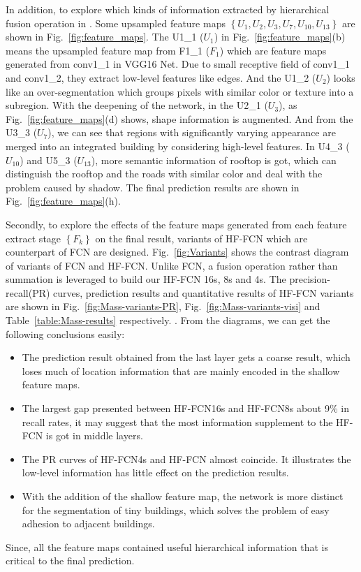 In addition, to explore which kinds of information extracted by hierarchical fusion operation in .
Some upsampled feature maps ${\left\{U_1,U_2,U_3,U_7,U_{10},U_{13}\right\}}$ are shown in Fig.~\ref{fig:feature_maps}.
The U1\_1 (${U_1}$) in Fig.~\ref{fig:feature_maps}(b) means the upsampled feature map from F1\_1 (${F_1}$) which are feature maps generated from conv1\_1 in VGG16 Net.
Due to small receptive field of conv1\_1 and conv1\_2, they extract low-level features like edges.
And the U1\_2 (${U_2}$) looks like an over-segmentation which groups pixels with similar color or texture into a subregion.
With the deepening of the network, in the U2\_1 (${U_3}$), as Fig.~\ref{fig:feature_maps}(d) shows, shape information is augmented.
And from the U3\_3 (${U_7}$), we can see that regions with significantly varying appearance are merged into an integrated building by considering high-level features.
In U4\_3 (${U_{10}}$) and U5\_3 ($U_{13}$), more semantic information of rooftop is got, which can distinguish the rooftop and the roads with similar color and deal with the problem caused by shadow.
The final prediction results are shown in Fig.~\ref{fig:feature_maps}(h).

Secondly, to explore the effects of the feature maps generated from each feature extract stage ${\left\{F_k\right\}}$ on the final result, variants of HF-FCN which are counterpart of FCN are designed.
Fig.~\ref{fig:Variants} shows the contrast diagram of variants of FCN and HF-FCN.
Unlike FCN, a fusion operation rather than summation is leveraged to build our HF-FCN 16s, 8s and 4s.
The precision-recall(PR) curves, prediction results and quantitative results of HF-FCN variants are shown in Fig.~\ref{fig:Mass-variants-PR}, Fig.~\ref{fig:Mass-variants-visi} and Table~\ref{table:Mass-results} respectively. .
From the diagrams, we can get the following conclusions easily:
\begin{itemize}
 \item The prediction result obtained from the last layer gets a coarse result, which loses much of location information that are mainly encoded in the shallow feature maps.
 \item The largest gap presented between HF-FCN16s and HF-FCN8s about 9{\%} in recall rates, it may suggest that the most information supplement to the HF-FCN is got in middle layers.
 \item The PR curves of HF-FCN4s and HF-FCN almost coincide. It illustrates the low-level information has little effect on the prediction results.
 \item With the addition of the shallow feature map, the network is more distinct for the segmentation of tiny buildings, which solves the problem of easy adhesion to adjacent buildings.
\end{itemize}
Since, all the feature maps contained useful hierarchical information that is critical to the final prediction.

